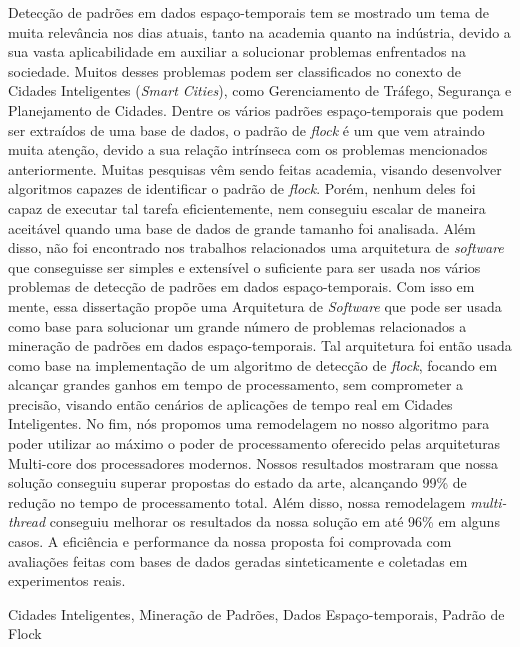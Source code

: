Detecção de padrões em dados espaço-temporais tem se mostrado um tema de muita relevância nos dias atuais, tanto na
academia quanto na indústria, devido a sua vasta aplicabilidade em auxiliar a solucionar problemas enfrentados na
sociedade. Muitos desses problemas podem ser classificados no conexto de Cidades Inteligentes (\textit{Smart Cities}),
como Gerenciamento de Tráfego, Segurança e Planejamento de Cidades. Dentre os vários padrões espaço-temporais que podem
ser extraídos de uma base de dados, o padrão de \textit{flock} é um que vem atraindo muita atenção, devido a sua relação
intrínseca com os problemas mencionados anteriormente. Muitas pesquisas vêm sendo feitas academia, visando desenvolver
algoritmos capazes de identificar o padrão de \textit{flock}. Porém, nenhum deles foi capaz de executar tal tarefa
eficientemente, nem conseguiu escalar de maneira aceitável quando uma base de dados de grande tamanho foi analisada.
Além disso, não foi encontrado nos trabalhos relacionados uma arquitetura de \textit{software} que conseguisse ser
simples e extensível o suficiente para ser usada nos vários problemas de detecção de padrões em dados espaço-temporais.
Com isso em mente, essa dissertação propõe uma Arquitetura de \textit{Software} que pode ser usada como base para
solucionar um grande número de problemas relacionados a mineração de padrões em dados espaço-temporais. Tal arquitetura
foi então usada como base na implementação de um algoritmo de detecção de \textit{flock}, focando em alcançar grandes
ganhos em tempo de processamento, sem comprometer a precisão, visando então cenários de aplicações de tempo real em
Cidades Inteligentes. No fim, nós propomos uma remodelagem no nosso algoritmo para poder utilizar ao máximo o poder de
processamento oferecido pelas arquiteturas Multi-core dos processadores modernos. Nossos resultados mostraram que nossa
solução conseguiu superar propostas do estado da arte, alcançando 99\% de redução no tempo de processamento total. Além
disso, nossa remodelagem \textit{multi-thread} conseguiu melhorar os resultados da nossa solução em até 96\% em alguns
casos. A eficiência e performance da nossa proposta foi comprovada com avaliações feitas com bases de dados geradas
sinteticamente e coletadas em experimentos reais.

\begin{keywords}
Cidades Inteligentes, Mineração de Padrões, Dados Espaço-temporais, Padrão de Flock
\end{keywords}
